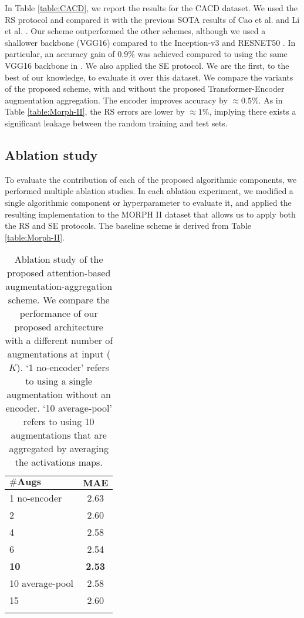 \documentclass[10pt,journal]{IEEEtran}\usepackage{amsfonts}
\begin{document}
In Table \ref{table:CACD}, we report the results for the CACD dataset. We used
the RS protocol and compared it with the previous SOTA results of Cao et al.
\cite{coral} and Li et al. \cite{li2019facial}. Our scheme outperformed the
other schemes, although we used a shallower backbone (VGG16) compared to the
Inception-v3 \cite{coral} and RESNET50 \cite{li2019facial}. In particular, an
accuracy gain of 0.9\% was achieved compared to using the same VGG16 backbone
in \cite{coral}. We also applied the SE protocol. We are the first, to the
best of our knowledge, to evaluate it over this dataset. We compare the
variants of the proposed scheme, with and without the proposed
Transformer-Encoder augmentation aggregation. The encoder improves accuracy by
$\approx0.5\%$. As in Table \ref{table:Morph-II}, the RS errors are lower by
$\approx1\%$, implying there exists a significant leakage between the random
training and test sets.

\subsection{Ablation study}

\label{subsec:Ablation study}

To evaluate the contribution of each of the proposed algorithmic components,
we performed multiple ablation studies. In each ablation experiment, we
modified a single algorithmic component or hyperparameter to evaluate it, and
applied the resulting implementation to the MORPH II dataset that allows us to
apply both the RS and SE protocols. The baseline scheme is derived from Table
\ref{table:Morph-II}.

\begin{table}[tbh]
\caption{Ablation study of the proposed attention-based
augmentation-aggregation scheme. We compare the performance of our proposed
architecture with a different number of augmentations at input ($K$). `1
no-encoder' refers to using a single augmentation without an encoder. `10
average-pool' refers to using 10 augmentations that are aggregated by
averaging the activations maps.}\label{table:ablation-aug}
\centering
\renewcommand{\arraystretch}{1.3}
\begin{tabular}
[c]{@{}lc}\toprule $\mathbf{\# Augs}$ & $\mathbf{MAE}$\\
\midrule 1 no-encoder & 2.63\\
2 & 2.60\\
4 & 2.58\\
6 & 2.54\\
\textbf{10} & \textbf{2.53}\\
10 average-pool & 2.58\\
15 & 2.60\\
\bottomrule &
\end{tabular}
\end{table}
\end{document}
